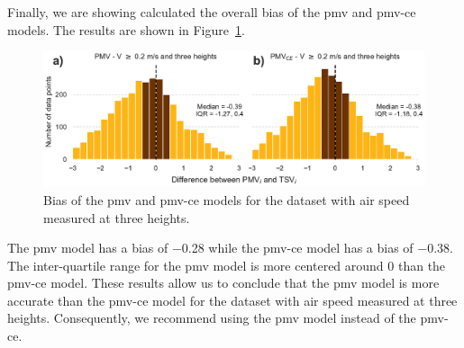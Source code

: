 Finally, we are showing calculated the overall bias of the \ac{pmv} and \ac{pmv-ce} models.
The results are shown in Figure~\ref{fig:hist_discrepancies_three_heights}.
\begin{figure}[htb!]
    \centering
    \includegraphics[width=\textwidth]{figures/hist_discrepancies_three_heights}
    \caption{Bias of the \ac{pmv} and \ac{pmv-ce} models for the dataset with air speed measured at three heights.}
    \label{fig:hist_discrepancies_three_heights}
\end{figure}
The \ac{pmv} model has a bias of \num{-.28} while the \ac{pmv-ce} model has a bias of \num{-.38}.
The inter-quartile range for the \ac{pmv} model is more centered around \num{0} than the \ac{pmv-ce} model.
These results allow us to conclude that the \ac{pmv} model is more accurate than the \ac{pmv-ce} model for the dataset with air speed measured at three heights.
Consequently, we recommend using the \ac{pmv} model instead of the \ac{pmv-ce}.

